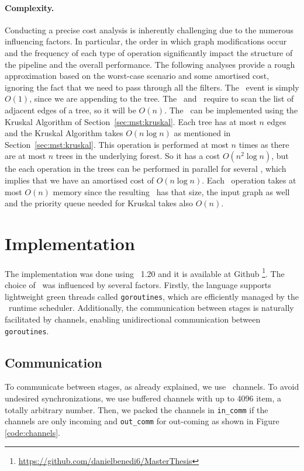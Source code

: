\paragraph{Complexity.}
Conducting a precise cost analysis is inherently challenging due to the numerous influencing factors. In particular, the order in which graph modifications occur and the frequency of each type of operation significantly impact the structure of the pipeline and the overall performance. The following analyses provide a rough approximation based on the worst-case scenario and some amortised cost, ignoring the fact that we need to pass through all the filters. The \opinsert\  event is simply $O(1)$, since we are appending to the tree. The \opupdate\ and \opremove\ require to scan the list of adjacent edges of a tree, so it will be $O(n)$. The \opmst\ can be implemented using the Kruskal Algorithm of Section~\ref{sec:mst:kruskal}. Each tree has at most $n$ edges and the Kruskal Algorithm takes $O(n\log n)$ as mentioned in Section~\ref{sec:mst:kruskal}. This operation is performed at most $n$ times as there are at most $n$ trees in the underlying forest. So it has a cost $O(n^2 \log n)$, but the each operation in the trees can be performed in parallel for several \msts, which implies that we have an amortised cost of $O(n \log n)$. Each \opmst\ operation takes at most $O(n)$ memory since the resulting \mst\ has that size, the input graph as well and the priority queue needed for Kruskal takes also $O(n)$.
%
\section{Implementation}
The implementation was done using \Golang\ 1.20 and it is available at Github \footnote{\href{https://github.com/danielbenedi6/MasterThesis}{https://github.com/danielbenedi6/MasterThesis}}. The choice of \Go\ was influenced by several factors. Firstly, the language supports lightweight green threads called \texttt{goroutines}, which are efficiently managed by the \Go\ runtime scheduler. Additionally, the communication between stages is naturally facilitated by channels, enabling unidirectional communication between \texttt{goroutines}.

\subsection*{Communication}

To communicate between stages, as already explained, we use \Go\ channels. To avoid undesired synchronizations, we use buffered channels with up to 4096 item, a totally arbitrary number. Then, we packed the channels in \verb|in_comm| if the channels are only incoming and \verb|out_comm| for out-coming as shown in Figure \ref{code:channels}.

